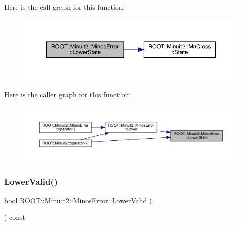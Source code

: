 Here is the call graph for this function\+:
\nopagebreak
\begin{figure}[H]
\begin{center}
\leavevmode
\includegraphics[width=350pt]{d2/dd1/classROOT_1_1Minuit2_1_1MinosError_ac10a407a1cb13f4e0c1b4d21383d15df_cgraph}
\end{center}
\end{figure}
Here is the caller graph for this function\+:\nopagebreak
\begin{figure}[H]
\begin{center}
\leavevmode
\includegraphics[width=350pt]{d2/dd1/classROOT_1_1Minuit2_1_1MinosError_ac10a407a1cb13f4e0c1b4d21383d15df_icgraph}
\end{center}
\end{figure}
\mbox{\label{classROOT_1_1Minuit2_1_1MinosError_a4b8c37c90bb53d98d3b4364a5ebc2228}} 
\subsubsection{\texorpdfstring{LowerValid()}{LowerValid()}\hspace{0.1cm}{\footnotesize\ttfamily [1/2]}}
{\footnotesize\ttfamily bool R\+O\+O\+T\+::\+Minuit2\+::\+Minos\+Error\+::\+Lower\+Valid (\begin{DoxyParamCaption}{ }\end{DoxyParamCaption}) const\hspace{0.3cm}{\ttfamily [inline]}}


